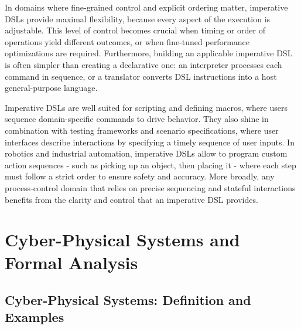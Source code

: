 In domains where fine-grained control and explicit ordering matter, imperative DSLs provide maximal flexibility, because every aspect of the execution is adjustable.
This level of control becomes crucial when timing or order of operations yield different outcomes, or when fine-tuned performance optimizations are required.
Furthermore, building an applicable imperative DSL is often simpler than creating a declarative one: an interpreter processes each command in sequence,
or a translator converts DSL instructions into a host general-purpose language.

Imperative DSLs are well suited for scripting and defining macros, where users sequence domain-specific commands to drive behavior. They also shine in combination with testing
frameworks and scenario specifications, where user interfaces describe interactions by specifying a timely sequence of user inputs. In robotics and industrial automation,
imperative DSLs allow to program custom action sequences - such as picking up an object, then placing it - where each step must follow a
strict order to ensure safety and accuracy. More broadly, any process-control domain that relies on precise sequencing and stateful interactions benefits from the clarity
and control that an imperative DSL provides.

\chapter{Cyber-Physical Systems and Formal Analysis}

\section{Cyber-Physical Systems: Definition and Examples}

